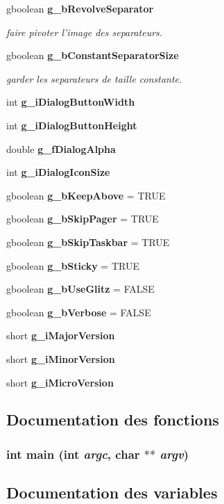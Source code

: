 \begin{CompactItemize}
$$gboolean {\bf g\_\-b\-Revolve\-Separator}
\begin{CompactList}\small\item\em faire pivoter l'image des separateurs. \item\end{CompactList}\item 
gboolean {\bf g\_\-b\-Constant\-Separator\-Size}
\begin{CompactList}\small\item\em garder les separateurs de taille constante. \item\end{CompactList}\item 
int {\bf g\_\-i\-Dialog\-Button\-Width}
\item 
int {\bf g\_\-i\-Dialog\-Button\-Height}
\item 
double {\bf g\_\-f\-Dialog\-Alpha}
\item 
int {\bf g\_\-i\-Dialog\-Icon\-Size}
\item 
gboolean {\bf g\_\-b\-Keep\-Above} = TRUE
\item 
gboolean {\bf g\_\-b\-Skip\-Pager} = TRUE
\item 
gboolean {\bf g\_\-b\-Skip\-Taskbar} = TRUE
\item 
gboolean {\bf g\_\-b\-Sticky} = TRUE
\item 
gboolean {\bf g\_\-b\-Use\-Glitz} = FALSE
\item 
gboolean {\bf g\_\-b\-Verbose} = FALSE
\item 
short {\bf g\_\-i\-Major\-Version}
\item 
short {\bf g\_\-i\-Minor\-Version}
\item 
short {\bf g\_\-i\-Micro\-Version}
\end{CompactItemize}


\subsection{Documentation des fonctions}
\subsubsection{\setlength{\rightskip}{0pt plus 5cm}int main (int {\em argc}, char $\ast$$\ast$ {\em argv})}\label{cairo-dock_8c_3c04138a5bfe5d72780bb7e82a18e627}




\subsection{Documentation des variables}
